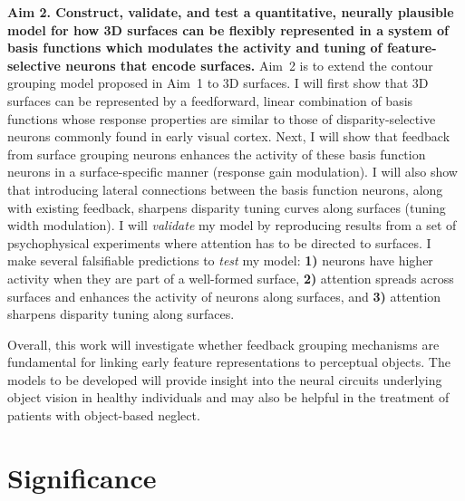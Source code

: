 \documentclass[11pt]{article}
\begin{document}
\bigskip

\textbf{\large Aim 2. Construct, validate, and test a quantitative,
  neurally plausible 
  model for how 3D surfaces can be flexibly represented in a
  system of basis functions which modulates the activity and tuning of
  feature-selective neurons that encode surfaces.}  Aim~2 is to
extend the contour grouping model proposed in Aim~1 to 3D surfaces. I
will first show that 
3D surfaces can be represented by a feedforward, linear combination of
basis functions whose response properties are similar to those of disparity-selective
neurons commonly found in early visual cortex. 
%
Next, I will
show that feedback from surface grouping neurons enhances the activity
of these basis function neurons in a 
surface-specific 
manner (response gain modulation). I will also show that introducing lateral
connections between the basis function neurons, along with existing
feedback, sharpens disparity tuning curves along surfaces (tuning
width modulation). I will {\em validate} my model by reproducing
results from a set of psychophysical experiments where attention has to be
directed to surfaces. I make several falsifiable predictions to \textit{test}
my model:
\textbf{1)} neurons have higher activity when they are part of a
well-formed surface, \textbf{2)} attention spreads across surfaces and
enhances the activity of neurons along surfaces, and \textbf{3)}
attention sharpens disparity tuning along surfaces.  \bigskip

Overall, this work will investigate whether feedback
    grouping mechanisms are fundamental for linking early feature
    representations to perceptual objects. The models to be
developed will
provide insight into the neural circuits underlying object vision
in healthy individuals and may
also be helpful in the treatment of patients with object-based
neglect.

\setcounter{section}{0} %
\clearpage

\section{Significance}
\end{document}
